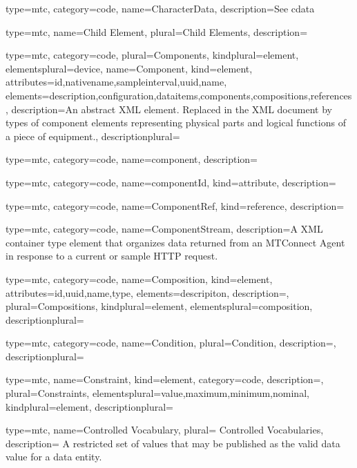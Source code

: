 {
  type=mtc,
  category=code,
  name={CharacterData},
  description={See \gls{cdata}}
}


{
  type=mtc,
  name={Child Element},
  plural={Child Elements},
  description={}
}


{
  type=mtc,
  category=code,
  plural={Components},
  kindplural={element},
  elementsplural={\gls{device}},
  name={Component},
  kind={element},
  attributes={\gls{id},\gls{nativename},\gls{sampleinterval},\gls{uuid},\gls{name}},
  elements={\gls{description},\gls{configuration},\glspl{dataitem},\glspl{component},\glspl{composition},\glspl{reference}},
  description={An abstract XML element. Replaced in the XML document by types of \gls{component} elements representing physical parts and logical functions of a piece of equipment.},
  descriptionplural={} 
}


{
  type=mtc,
  category=code,
  name={component},
  description={}
}


{
  type=mtc,
  category=code,
  name={componentId},
  kind={attribute},
  description={}
}


{
  type=mtc,
  category=code,
  name={ComponentRef},
  kind={reference},
  description={} 
}


{
  type=mtc,
  category=code,
  name={ComponentStream},
  description={A XML container type element that organizes data returned from an MTConnect Agent in response to a current or sample HTTP request.} 
}


{
  type=mtc,
  category=code,
  name={Composition},
  kind={element},
  attributes={\gls{id},\gls{uuid},\gls{name},\gls{type}},
  elements={\gls{descripiton}},
  description={},
  plural={Compositions},
  kindplural={element},
  elementsplural={\gls{composition}},
  descriptionplural={}
}


{
  type=mtc,
  category=code,
  name={Condition},
  plural={Condition},
  description={},
  descriptionplural={}
}


{
  type=mtc,
  name={Constraint},
  kind={element},
  category=code,
  description={},
  plural={Constraints},
  elementsplural={\gls{value},\gls{maximum},\gls{minimum},\gls{nominal}},
  kindplural={element},
  descriptionplural={}
}


{
  type=mtc,
  name={Controlled Vocabulary},
  plural= {Controlled Vocabularies},
  description= {A restricted set of values that may be published as the \gls{valid data value} for a \gls{data entity}.}
}


